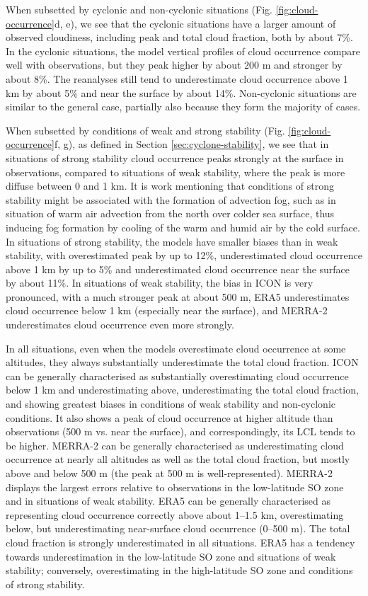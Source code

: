 \documentclass[12pt,a4paper]{article}
\begin{document}
When subsetted by cyclonic and non-cyclonic situations (Fig.
\ref{fig:cloud-occurrence}d, e), we see that the cyclonic situations have a
larger amount of observed cloudiness, including peak and total cloud fraction,
both by about 7\%.  In the cyclonic situations, the model vertical profiles of
cloud occurrence compare well with observations, but they peak higher by about
200 m and stronger by about 8\%. The reanalyses still tend to underestimate
cloud occurrence above 1 km by about 5\% and near the surface by about 14\%.
Non-cyclonic situations are similar to the general case, partially also because
they form the majority of cases.

When subsetted by conditions of weak and strong stability (Fig.
\ref{fig:cloud-occurrence}f, g), as defined in Section
\ref{sec:cyclone-stability}, we see that in situations of strong stability
cloud occurrence peaks strongly at the surface in observations, compared to
situations of weak stability, where the peak is more diffuse between 0 and 1
km.  It is work mentioning that conditions of strong stability might be
associated with the formation of advection fog, such as in situation of warm
air advection from the north over colder sea surface, thus inducing fog
formation by cooling of the warm and humid air by the cold surface.  In
situations of strong stability, the models have smaller biases than in weak
stability, with overestimated peak by up to 12\%, underestimated cloud
occurrence above 1 km by up to 5\% and underestimated cloud occurrence near the
surface by about 11\%.  In situations of weak stability, the bias in ICON is
very pronounced, with a much stronger peak at about 500 m, ERA5 underestimates
cloud occurrence below 1 km (especially near the surface), and MERRA-2
underestimates cloud occurrence even more strongly.

In all situations, even when the models overestimate cloud occurrence at some
altitudes, they always substantially underestimate the total cloud fraction.
ICON can be generally characterised as substantially overestimating cloud
occurrence below 1 km and underestimating above, underestimating the total
cloud fraction, and showing greatest biases in conditions of weak stability and
non-cyclonic conditions. It also shows a peak of cloud occurrence at higher
altitude than observations (500 m vs. near the surface), and correspondingly,
its LCL tends to be higher. MERRA-2 can be generally characterised as
underestimating cloud occurrence at nearly all altitudes as well as the total
cloud fraction, but mostly above and below 500 m (the peak at 500 m is
well-represented). MERRA-2 displays the largest errors relative to observations
in the low-latitude SO zone and in situations of weak stability. ERA5 can be
generally characterised as representing cloud occurrence correctly above about
1--1.5 km, overestimating below, but underestimating near-surface cloud
occurrence (0--500 m). The total cloud fraction is strongly underestimated in
all situations. ERA5 has a tendency towards underestimation in the low-latitude
SO zone and situations of weak stability; conversely, overestimating in the
high-latitude SO zone and conditions of strong stability.
\end{document}

